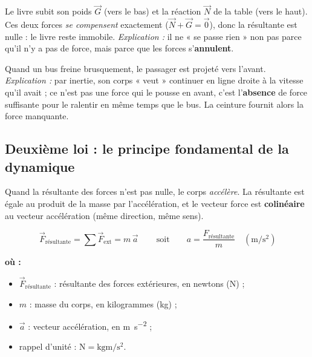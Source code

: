 \documentclass[11pt,a4paper]{article}
\newenvironment{ou}{%
  \par\smallskip\noindent\textbf{où :}\nopagebreak
  \begin{itemize}[leftmargin=1.8em,topsep=2pt,itemsep=1.5pt,parsep=0pt]}%
  {\end{itemize}}
\newcommand{\vv}[1]{\vec{#1}}
\newcommand{\mss}{\si{\metre\per\second\squared}}
\begin{document}
\begin{exemple}
Le livre subit son poids $\vv G$ (vers le bas) et la réaction $\vv N$ de la table (vers le haut).
Ces deux forces \emph{se compensent} exactement ($\vv N+\vv G=\vv0$), donc la résultante est nulle :
le livre reste immobile. \emph{Explication :} il ne « se passe rien » non pas parce qu'il n'y a pas
de force, mais parce que les forces s'\textbf{annulent}.
\end{exemple}

\begin{exemple}
Quand un bus freine brusquement, le passager est projeté vers l'avant. \emph{Explication :} par
inertie, son corps « veut » continuer en ligne droite à la vitesse qu'il avait ; ce n'est pas une
force qui le pousse en avant, c'est l'\textbf{absence} de force suffisante pour le ralentir en même
temps que le bus. La ceinture fournit alors la force manquante.
\end{exemple}

\subsection{Deuxième loi : le principe fondamental de la dynamique}

\begin{theoreme}
Quand la résultante des forces n'est pas nulle, le corps \emph{accélère}. La résultante est égale
au produit de la masse par l'accélération, et le vecteur force est \textbf{colinéaire} au vecteur
accélération (même direction, même sens).
\end{theoreme}

\begin{formule}
\[ \boxed{\,\vv F_{\text{résultante}}=\sum\vv F_{\text{ext}}=m\,\vv a\,}\qquad
   \text{soit}\qquad a=\dfrac{F_{\text{résultante}}}{m}\quad(\mss) \]
\begin{ou}
  \item $\vv F_{\text{résultante}}$ : résultante des forces extérieures, en newtons (\si{\newton}) ;
  \item $m$ : masse du corps, en kilogrammes (\si{\kilogram}) ;
  \item $\vv a$ : vecteur accélération, en \si{\metre\per\second\squared} ;
  \item rappel d'unité : $\si{\newton}=\si{\kilogram\metre\per\second\squared}$.
\end{ou}
\end{formule}
\end{document}
